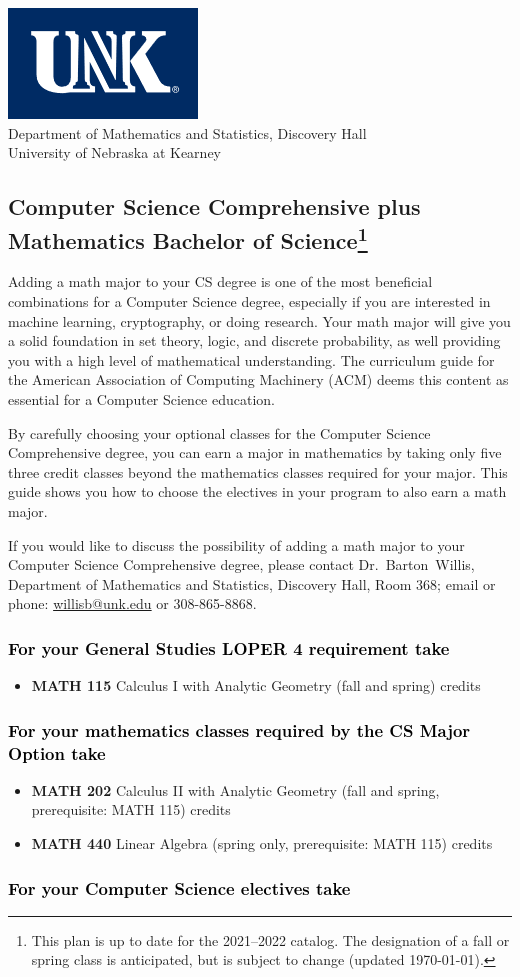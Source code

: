 \documentclass[10pt]{article}
\makeatletter
\newcommand{\calcone}{\textbf{MATH 115} Calculus I with Analytic Geometry (fall and spring) \dotfill 5 credits}
\newcommand{\calctwo}{\textbf{MATH 202} Calculus II with Analytic Geometry (fall and spring, prerequisite: MATH 115) \dotfill 5 credits }
\newcommand{\linear}{\textbf{MATH 440} Linear Algebra (spring only, prerequisite: MATH 115) \dotfill 3 credits}
\newcommand{\contactbw}{\mbox{Dr.\ Barton Willis}, Department of Mathematics and Statistics,  Discovery Hall, Room 368;
email or phone: \href{mailto:willisb@unk.edu}{willisb@unk.edu} or 308-865-8868.}
\newcommand{\forinfo}[2]{If you would like to discuss the possibility of adding a math {#1} to your {#2}, please contact \contactbw}
\newcommand{\catalog}{2021--2022 }
\newcommand{\myfootnote}{\footnote{This plan is up to date for  the \catalog catalog. The designation of a fall or spring class is 
anticipated, but  is subject to change (updated  \today).}}
\newcommand{\myheading}{
\begin{flushleft}
\includegraphics[scale=0.35]{unk-logo}\\
\setcounter{footnote}{0}
\vspace{0.25in}
 \textcolor{unkblue}{Department of Mathematics and Statistics, Discovery Hall} \\
  \textcolor{unkblue}{University of Nebraska at Kearney}
\end{flushleft}}
\makeatother
\begin{document}
\myheading



\vspace{-0.1in}
\subsection*{\textbf{\textcolor{unkblue}{Computer Science Comprehensive plus Mathematics Bachelor of Science\myfootnote}}}

Adding a math major to your CS degree is one of the most beneficial combinations for a Computer Science degree, especially if you are interested in machine learning, cryptography,   or doing research.  Your math major  will give you a solid foundation in set theory, logic, and discrete probability, as well providing you with a high level of mathematical understanding.  The curriculum guide for the American Association of Computing Machinery (ACM) deems  this
content  as essential for  a Computer Science education.

By carefully choosing your optional classes for the Computer Science Comprehensive degree, you can earn a major in mathematics by taking only five three credit classes beyond the mathematics classes required for your major. This guide shows you how to choose the electives in your program to also earn a math major.


\forinfo{major}{Computer Science Comprehensive degree}


\subsubsection*{\textcolor{black}{For  your General Studies LOPER 4 requirement take}}
\begin{itemize}
\item \calcone
\end{itemize}


\subsubsection*{\textcolor{black}{For your mathematics classes required by the CS Major Option take}}
\begin{itemize}
\item \calctwo
\item \linear
\end{itemize}

\subsubsection*{\textcolor{black}{For your Computer Science electives take}}
\end{document}

